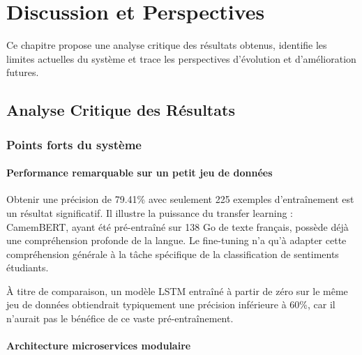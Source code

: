 \chapter{Discussion et Perspectives}

\begin{infobox}
Ce chapitre propose une analyse critique des résultats obtenus, identifie
les limites actuelles du système et trace les perspectives d'évolution
et d'amélioration futures.
\end{infobox}

\section{Analyse Critique des Résultats}

\subsection{Points forts du système}

\subsubsection{Performance remarquable sur un petit jeu de données}

Obtenir une précision de 79.41\% avec seulement 225 exemples d'entraînement
est un résultat significatif. Il illustre la puissance du transfer learning :
CamemBERT, ayant été pré-entraîné sur 138 Go de texte français, possède
déjà une compréhension profonde de la langue. Le fine-tuning n'a qu'à
adapter cette compréhension générale à la tâche spécifique de la
classification de sentiments étudiants.

À titre de comparaison, un modèle LSTM entraîné à partir de zéro sur le
même jeu de données obtiendrait typiquement une précision inférieure à 60\%,
car il n'aurait pas le bénéfice de ce vaste pré-entraînement.

\subsubsection{Architecture microservices modulaire}

